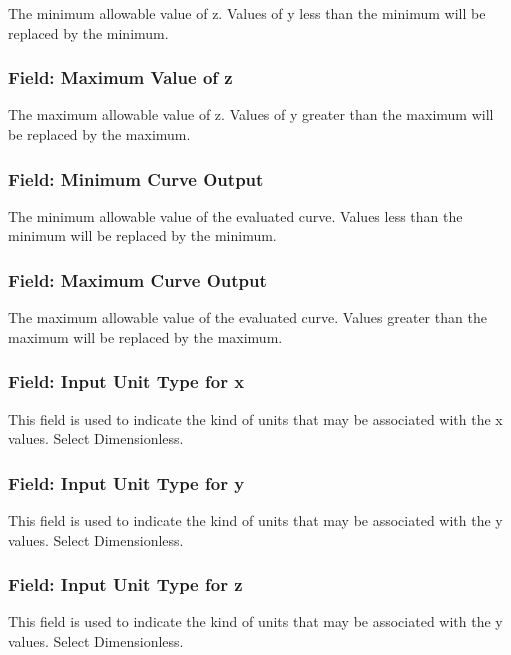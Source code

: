 The minimum allowable value of z. Values of y less than the minimum will be replaced by the minimum.

\subsubsection{Field: Maximum Value of z}\label{field-maximum-value-of-z-1}

The maximum allowable value of z. Values of y greater than the maximum will be replaced by the maximum.

\subsubsection{Field: Minimum Curve Output}\label{field-minimum-curve-output-8}

The minimum allowable value of the evaluated curve. Values less than the minimum will be replaced by the minimum.

\subsubsection{Field: Maximum Curve Output}\label{field-maximum-curve-output-7}

The maximum allowable value of the evaluated curve. Values greater than the maximum will be replaced by the maximum.

\subsubsection{Field: Input Unit Type for x}\label{field-input-unit-type-for-x-9}

This field is used to indicate the kind of units that may be associated with the x values. Select Dimensionless.

\subsubsection{Field: Input Unit Type for y}\label{field-input-unit-type-for-y-4}

This field is used to indicate the kind of units that may be associated with the y values. Select Dimensionless.

\subsubsection{Field: Input Unit Type for z}\label{field-input-unit-type-for-z-1}

This field is used to indicate the kind of units that may be associated with the y values. Select Dimensionless.

